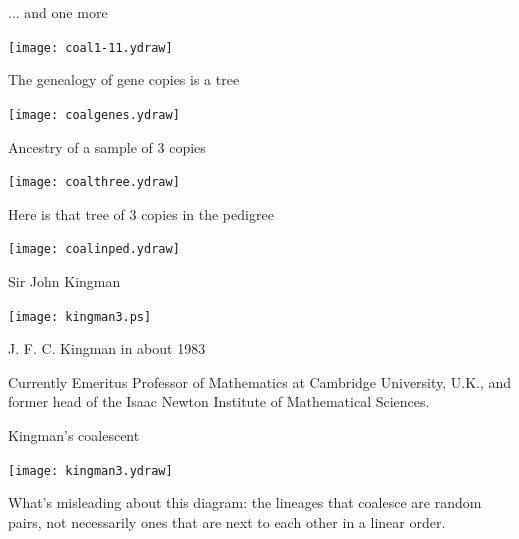 \documentclass[bluish,slideColor,colorBG,pdf]{prosper}
\begin{document}
\begin{slide}[Replace]{ ... and one more}

\vspace{-0.2in}

\centerline{\texttt{[image: coal1-11.ydraw]}}

\end{slide}

\begin{slide}[Replace]{The genealogy of gene copies is a tree}

\centerline{\texttt{[image: coalgenes.ydraw]}}

\end{slide}

\begin{slide}[Replace]{Ancestry of a sample of 3 copies}

\centerline{\texttt{[image: coalthree.ydraw]}}

\end{slide}

\begin{slide}[Replace]{Here is that tree of 3 copies in the pedigree}

\centerline{\texttt{[image: coalinped.ydraw]}}

\end{slide}

\begin{slide}[Replace]{Sir John Kingman}

\centerline{\texttt{[image: kingman3.ps]}}
\bigskip

\centerline{J. F. C. Kingman in about 1983}
\bigskip

Currently Emeritus Professor of Mathematics at Cambridge University,
U.K., and former head of the Isaac Newton Institute of Mathematical
Sciences.

\end{slide}

\begin{slide}[Replace]{Kingman's coalescent}

\centerline{\texttt{[image: kingman3.ydraw]}}
\bigskip

What's misleading about this diagram: the lineages that coalesce are random
pairs, not necessarily ones that are next to each other in a linear order.

\end{slide}
\end{document}
